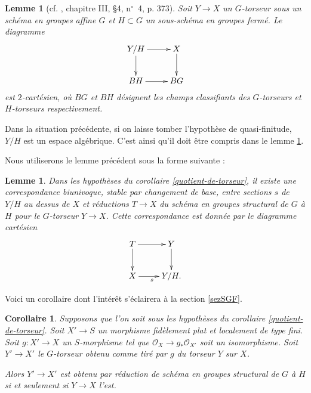 \documentclass[11pt]{amsart}
\numberwithin{equation}{section}
\newtheorem{lem}[thm]{Lemme}
\newtheorem{cor}[thm]{Corollaire}
\theoremstyle{definition}
\theoremstyle{remark}
\newcommand{\dO}{{\mathcal O}}
\begin{document}
\begin{lem}[cf. \cite{DG}, chapitre III, \S 4, n${}^\circ$~4, p. 373]\label{cartesien}
Soit $Y \to X$ un $G$-torseur sous un sch\'ema en groupes affine $G$ et $H \subset G$ un sous-sch\'ema en groupes ferm\'e. Le diagramme
$$\xymatrix{Y/H \ar[r] \ar[d] & X \ar[d]\\
BH \ar[r] &BG\\}$$
est $2$-cart\'esien, o\`u $BG$ et $BH$ d\'esignent les champs classifiants des $G$-torseurs et $H$-torseurs respectivement.
\end{lem}

Dans la situation pr\'ec\'edente, si on laisse tomber l'hypoth\`ese de quasi-finitude, $Y/H$ est un espace alg\'ebrique. C'est ainsi qu'il doit \^etre compris dans le lemme \ref{cartesien}.

Nous utiliserons le lemme pr\'ec\'edent sous la forme suivante :
\begin{lem}\label{cartesien1} Dans les hypoth\`eses du corollaire \ref{quotient-de-torseur},
il existe une correspondance biunivoque, stable par changement de base, entre sections $s$ de $Y/H$ au dessus de $X$ et r\'eductions $T \to X$ du sch\'ema en groupes structural de $G$ \`a $H$ pour le $G$-torseur $Y \to X$. Cette correspondance est donn\'ee par le diagramme cart\'esien
$$\xymatrix{T \ar[r] \ar[d] & Y \ar[d] \\
X\ar[r]_s & Y/H.\\}$$
\end{lem}

Voici un corollaire dont l'int\'er\^et s'\'eclairera \`a la section \ref{sezSGF}.


\begin{cor}\label{lemLEM22}  Supposons que l'on soit sous les hypoth\`eses du corollaire \ref{quotient-de-torseur}. Soit $X' \to S$ un morphisme fid\`element plat et localement de type fini. Soit $g : X' \to X$ un $S$-morphisme tel que $\dO _X \to g_ \ast \dO _{X'}$ soit un isomorphisme. Soit $Y'\to X'$ le $G$-torseur obtenu comme tir\'e par $g$ du torseur $Y$ sur $X$.


Alors $Y'\to X'$ est obtenu par r\'eduction de sch\'ema en groupes structural de $G$ \`a $H$ si et seulement si $Y\to X$ l'est.\end{cor}
\end{document}
